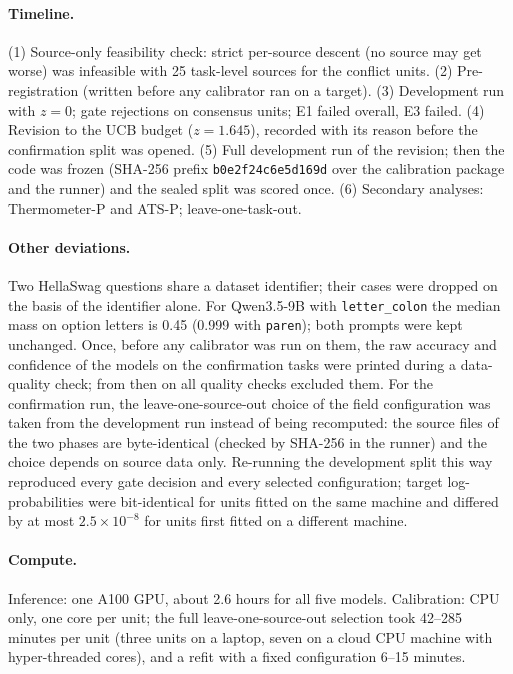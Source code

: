 \documentclass[11pt]{article}
\theoremstyle{remark}
\begin{document}
\paragraph{Timeline.}
(1) Source-only feasibility check: strict per-source descent (no source may get worse) was infeasible with 25 task-level sources for the conflict units.
(2) Pre-registration (written before any calibrator ran on a target).
(3) Development run with $z=0$; gate rejections on consensus units; E1 failed overall, E3 failed.
(4) Revision to the UCB budget ($z=1.645$), recorded with its reason before the confirmation split was opened.
(5) Full development run of the revision; then the code was frozen (SHA-256 prefix \texttt{b0e2f24c6e5d169d} over the calibration package and the runner) and the sealed split was scored once.
(6) Secondary analyses: Thermometer-P and ATS-P; leave-one-task-out.

\paragraph{Other deviations.}
Two HellaSwag questions share a dataset identifier; their cases were dropped on the basis of the identifier alone.
For Qwen3.5-9B with \texttt{letter\_colon} the median mass on option letters is 0.45 (0.999 with \texttt{paren}); both prompts were kept unchanged.
Once, before any calibrator was run on them, the raw accuracy and confidence of the models on the confirmation tasks were printed during a data-quality check; from then on all quality checks excluded them.
For the confirmation run, the leave-one-source-out choice of the field configuration was taken from the development run instead of being recomputed: the source files of the two phases are byte-identical (checked by SHA-256 in the runner) and the choice depends on source data only.
Re-running the development split this way reproduced every gate decision and every selected configuration; target log-probabilities were bit-identical for units fitted on the same machine and differed by at most $2.5\times10^{-8}$ for units first fitted on a different machine.

\paragraph{Compute.}
Inference: one A100 GPU, about 2.6 hours for all five models.
Calibration: CPU only, one core per unit; the full leave-one-source-out selection took 42--285 minutes per unit (three units on a laptop, seven on a cloud CPU machine with hyper-threaded cores), and a refit with a fixed configuration 6--15 minutes.
\end{document}
